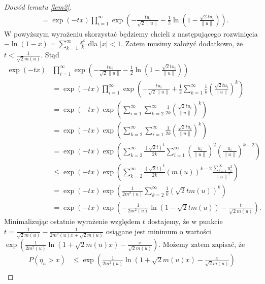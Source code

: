 \documentclass[man,mfiu]{mgrwms}
\newcommand{\norm}[1]{\left\lVert#1\right\rVert}
\begin{document}
\begin{proof}[Dowód lematu \ref{lem2}]
\begin{displaymath}
\begin{split}
&=\exp(-tx)\prod_{i=1}^{\infty}\exp\left(-\frac{tu_i}{\sqrt{2}\norm{u}}-\frac{1}{2}\ln\left(1-\frac{\sqrt{2}tu_i}{\norm{u}}\right)\right).
\end{split}
\end{displaymath}
W powyższym wyrażeniu skorzystać będziemy chcieli z następującego rozwinięcia $-\ln (1-x)=\sum_{k=1}^{\infty}\frac{x^k}{k}$ dla $|x|<1$. Zatem musimy założyć dodatkowo, że $t<\frac{1}{\sqrt{2}m(u)}$. Stąd
\begin{displaymath}
\begin{split}
\exp(-tx)&\prod_{i=1}^{\infty}\exp\left(-\frac{tu_i}{\sqrt{2}\norm{u}}-\frac{1}{2}\ln\left(1-\frac{\sqrt{2}tu_i}{\norm{u}}\right)\right)\\
&=\exp(-tx)\prod_{i=1}^{\infty}\exp\left(-\frac{tu_i}{\sqrt{2}\norm{u}}+\frac{1}{2}\sum_{k=1}^{\infty}\frac{1}{k}\left(\frac{\sqrt{2}tu_i}{\norm{u}}\right)^k\right)\\
&=\exp(-tx)\exp \left(\sum_{i=1}^{\infty}\sum_{k=2}^{\infty}\frac{1}{2k}\left(\frac{\sqrt{2}tu_i}{\norm{u}}\right)^k\right)\\
&=\exp(-tx)\exp \left(\sum_{k=2}^{\infty}\sum_{i=1}^{\infty}\frac{1}{2k}\left(\frac{\sqrt{2}tu_i}{\norm{u}}\right)^k\right)\\
&=\exp(-tx)\exp \left(\sum_{k=2}^{\infty}\frac{(\sqrt{2}t)^k}{2k}\sum_{i=1}^{\infty}\left(\frac{u_i}{\norm{u}}\right)^2\left(\frac{u_i}{\norm{u}}\right)^{k-2}\right)\\
&\leq \exp(-tx)\exp \left(\sum_{k=2}^{\infty}\frac{(\sqrt{2}t)^k}{2k}(m(u))^{k-2}\frac{\sum_{i=1}^{\infty}u_i^2}{\norm{u}^2}\right)\\
&=\exp(-tx)\exp \left(\frac{1}{2m^2(u)}\sum_{k=2}^{\infty}\frac{1}{k}\left(\sqrt{2}tm(u)\right)^k\right)\\
&=\exp(-tx)\exp \left(-\frac{1}{2m^2(u)}\ln \left(1-\sqrt{2}tm(u)\right)-\frac{t}{\sqrt{2}m(u)}\right).
\end{split}
\end{displaymath}
Minimalizując ostatnie wyrażenie względem $t$ dostajemy, że w punkcie $t=\frac{1}{\sqrt{2}m(u)}-\frac{1}{2m^2(u)x+\sqrt{2}m(u)}$ osiągane jest minimum o wartości\\ $\exp\left(\frac{1}{2m^2(u)}\ln \left(1+\sqrt{2}m(u)x\right)-\frac{x}{\sqrt{2}m(u)}\right)$. Możemy zatem zapisać, że
\begin{displaymath}
\begin{split}
P(\eta_u>x)&\leq \exp\left(\frac{1}{2m^2(u)}\ln \left(1+\sqrt{2}m(u)x\right)-\frac{x}{\sqrt{2}m(u)}\right)\\

\end{split}
\end{displaymath}
\end{proof}
\end{document}
